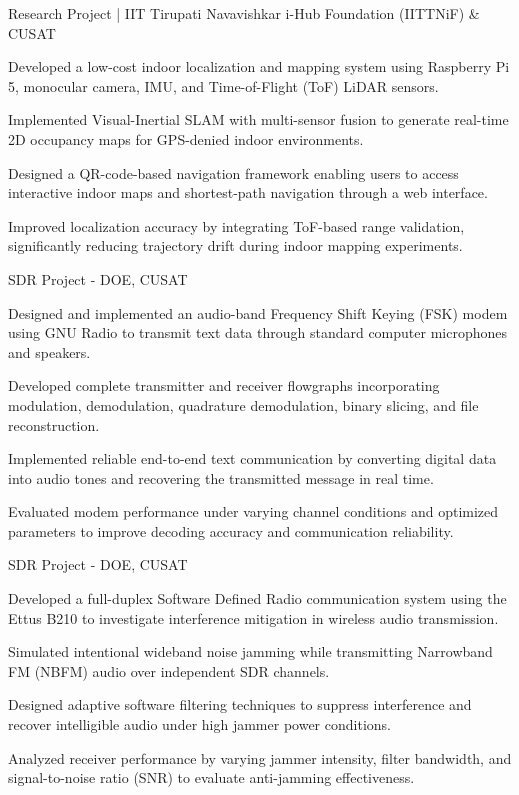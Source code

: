 \documentclass{my_cv}
\begin{document}
{Research Project | IIT Tirupati Navavishkar i-Hub Foundation (IITTNiF) \& CUSAT}
{
    \item Developed a low-cost indoor localization and mapping system using Raspberry Pi 5, monocular camera, IMU, and Time-of-Flight (ToF) LiDAR sensors.
    \item Implemented Visual-Inertial SLAM with multi-sensor fusion to generate real-time 2D occupancy maps for GPS-denied indoor environments.
    \item Designed a QR-code-based navigation framework enabling users to access interactive indoor maps and shortest-path navigation through a web interface.
    \item Improved localization accuracy by integrating ToF-based range validation, significantly reducing trajectory drift during indoor mapping experiments.
}

{SDR Project - DOE, CUSAT}
{
    \item Designed and implemented an audio-band Frequency Shift Keying (FSK) modem using GNU Radio to transmit text data through standard computer microphones and speakers.
    \item Developed complete transmitter and receiver flowgraphs incorporating modulation, demodulation, quadrature demodulation, binary slicing, and file reconstruction.
    \item Implemented reliable end-to-end text communication by converting digital data into audio tones and recovering the transmitted message in real time.
    \item Evaluated modem performance under varying channel conditions and optimized parameters to improve decoding accuracy and communication reliability.
}

{SDR Project - DOE, CUSAT}
{
    \item Developed a full-duplex Software Defined Radio communication system using the Ettus B210 to investigate interference mitigation in wireless audio transmission.
    \item Simulated intentional wideband noise jamming while transmitting Narrowband FM (NBFM) audio over independent SDR channels.
    \item Designed adaptive software filtering techniques to suppress interference and recover intelligible audio under high jammer power conditions.
    \item Analyzed receiver performance by varying jammer intensity, filter bandwidth, and signal-to-noise ratio (SNR) to evaluate anti-jamming effectiveness.
}
\end{document}
